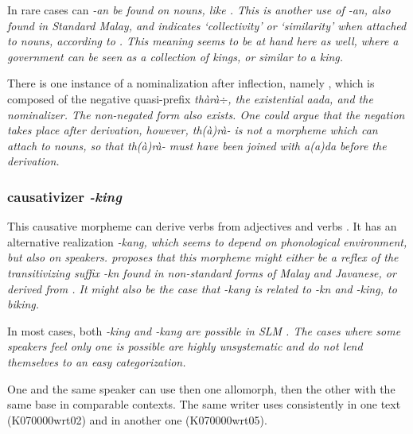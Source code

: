 In rare cases can \em -an \em be found on nouns, like . This is another use of \em -an\em, also found in Standard Malay, and indicates `collectivity' or `similarity'  when attached to nouns, according to \citet[193]{Adelaar1985}. This meaning seems to be at hand here as well, where a government can be seen as a collection of kings, or similar to a king.

There is one instance of a nominalization after inflection, namely , which is composed of the negative quasi-prefix \em thàrà$\div$\em, the existential \em aada, \em and the nominalizer. The non-negated form  also exists. One could argue that the negation takes place after derivation, however, \em th(à)rà- \em is not a morpheme which can attach to nouns, so that  \em th(à)rà- \em must have been joined with \em a(a)da \em before the derivation.

% 
% 
% 
% 

\subsubsection{causativizer \em -king\em}\label{sec:morph:-king}
This causative morpheme  can derive verbs from  adjectives and verbs . It has an alternative realization \em -kang\em, which seems to depend on phonological environment, but also on speakers.
\citet[29]{Adelaar1991} proposes that this morpheme might either be a reflex of the transitivizing suffix \em -k\E n \em found in non-standard forms of Malay and Javanese, or derived from . It might also be the case that \em -kang \em is related to \em -k\E n \em and \em -king, \em to \em biking\em.

In most cases, both \em -king \em and \em -kang \em are possible in SLM \citep[cf.][60]{Saldin2001}. 
The cases where some speakers feel only one is possible are highly unsystematic and do not lend themselves to an easy categorization.

One and the same speaker can use then one allomorph, then the other with the same base in comparable contexts. The same writer uses  consistently in one text (K070000wrt02) and  in another one (K070000wrt05).



